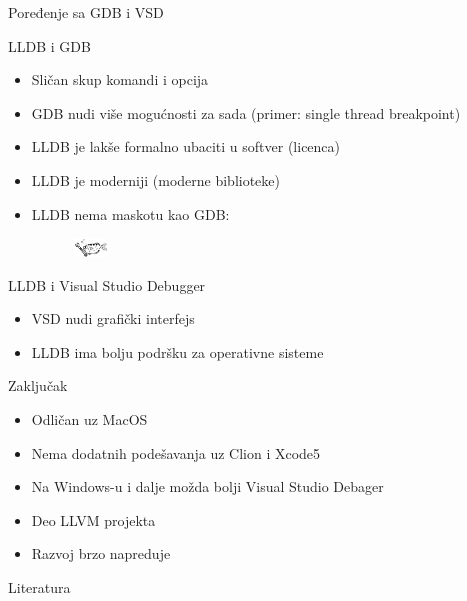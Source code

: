 \documentclass[bookmarks=true,bookmarksopen=true,pdfborder={0 0 0},pdfhighlight={/N},linkbordercolor={.5 .5 .5},implicit=false,unicode,xcolor={table}]{beamer}
\begin{document}
\begin{frame}{Poređenje sa GDB i VSD}
	
	LLDB i GDB
	\begin{itemize}
		\item Sličan skup komandi i opcija
		\item GDB nudi više mogućnosti za sada (primer: single thread breakpoint)
		\item LLDB je lakše formalno ubaciti u softver (licenca)
		\item LLDB je moderniji (moderne biblioteke)
		\item LLDB nema maskotu kao GDB:
		\begin{figure}
			\includegraphics[width=10mm,height=5mm]{Slike/gdb_mascot.png}
		\end{figure}
	\end{itemize}
	
	LLDB i Visual Studio Debugger
	\begin{itemize}
		\item VSD nudi grafički interfejs
		\item LLDB ima bolju podršku za operativne sisteme
	\end{itemize}

\end{frame}

\begin{frame}{Zaključak}
\begin{itemize}
	\item Odličan uz MacOS
	\item Nema dodatnih podešavanja uz Clion i Xcode5
	\item Na Windows-u i dalje možda bolji Visual Studio Debager
	\item Deo LLVM projekta
	\item Razvoj brzo napreduje
\end{itemize}
\end{frame}

\begin{frame}{Literatura}
  \nocite{*}
  
  
\end{frame}
\end{document}
